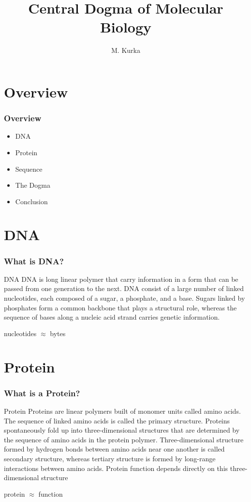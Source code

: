 \documentclass{beamer}
\title{Central Dogma of Molecular Biology}
\author{M. Kurka}
\institute{github.com/miroslavkurka/Alignment-lecture}
\begin{document}
\maketitle

\section{Overview}
\begin{frame}
    \frametitle{Overview}
    \begin{itemize}
        \item DNA
        \item Protein
        \item Sequence
        \item The Dogma
        \item Conclusion
    \end{itemize}
\end{frame}
\section{DNA}
\begin{frame}

\frametitle{What is DNA?}
\begin{exampleblock}{DNA}
    DNA is long linear polymer that carry information in a form that can be passed from one generation to the next. DNA consist of a large number of linked nucleotides, each
composed of a sugar, a phosphate, and a base. Sugars linked by phosphates form a common backbone that plays a structural role, whereas the sequence of bases along a nucleic acid strand carries genetic information.
\end{exampleblock}
\begin{exampleblock}{}
    nucleotides $\approx$ bytes 
\end{exampleblock}
\end{frame}

\section{Protein}
\begin{frame}
\frametitle{What is a Protein?}
\begin{exampleblock}{Protein}
    Proteins are linear polymers built of monomer units called amino acids. The sequence of linked amino acids is called the primary structure. Proteins spontaneously fold up into three-dimensional structures that are determined by the sequence of amino acids in the protein polymer. Three-dimensional structure formed by hydrogen bonds between amino acids near one another is called secondary structure, whereas tertiary structure is formed by long-range interactions between amino acids. Protein function depends directly on this three- dimensional structure 
\end{exampleblock}
\begin{exampleblock}{}
protein $\approx$ function
    
\end{exampleblock}
\end{frame}
\end{document}
